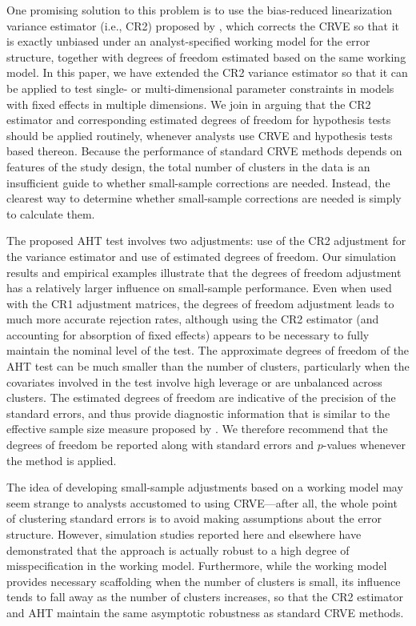 \documentclass[12pt]{article}\usepackage[]{graphicx}\usepackage[]{color}
\begin{document}
One promising solution to this problem is to use the bias-reduced linearization variance estimator (i.e., CR2) proposed by \citet{Bell2002bias}, which corrects the CRVE so that it is exactly unbiased under an analyst-specified working model for the error structure, together with degrees of freedom estimated based on the same working model.
In this paper, we have extended the CR2 variance estimator so that it can be applied to test single- or multi-dimensional parameter constraints in models with fixed effects in multiple dimensions. 
We join \citet{Imbens2015robust} in arguing that the CR2 estimator and corresponding estimated degrees of freedom for hypothesis tests should be applied routinely, whenever analysts use CRVE and hypothesis tests based thereon. 
Because the performance of standard CRVE methods depends on features of the study design, the total number of clusters in the data is an insufficient guide to whether small-sample corrections are needed. 
Instead, the clearest way to determine whether small-sample corrections are needed is simply to calculate them.

The proposed AHT test involves two adjustments: use of the CR2 adjustment for the variance estimator and use of estimated degrees of freedom. 
Our simulation results and empirical examples illustrate that the degrees of freedom adjustment has a relatively larger influence on small-sample performance.
Even when used with the CR1 adjustment matrices, the degrees of freedom adjustment leads to much more accurate rejection rates, although using the CR2 estimator (and accounting for absorption of fixed effects) appears to be necessary to fully maintain the nominal level of the test. 
The approximate degrees of freedom of the AHT test can be much smaller than the number of clusters, particularly when the covariates involved in the test involve high leverage or are unbalanced across clusters.
The estimated degrees of freedom are indicative of the precision of the standard errors, and thus provide diagnostic information that is similar to the effective sample size measure proposed by \citet{Carter2013asymptotic}. 
We therefore recommend that the degrees of freedom be reported along with standard errors and $p$-values whenever the method is applied.

The idea of developing small-sample adjustments based on a working model may seem strange to analysts accustomed to using CRVE---after all, the whole point of clustering standard errors is to avoid making assumptions about the error structure.
However, simulation studies reported here and elsewhere  have demonstrated that the approach is actually robust to a high degree of misspecification in the working model. 
Furthermore, while the working model provides necessary scaffolding when the number of clusters is small, its  influence tends to fall away as the number of clusters increases, so that the CR2 estimator and AHT maintain the same asymptotic robustness as standard CRVE methods. 
\end{document}
